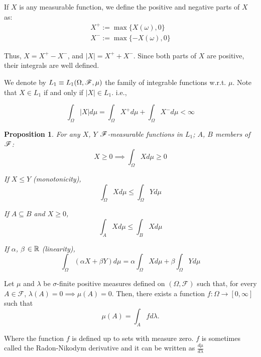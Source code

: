 \documentclass{beamer}
\newtheorem{proposition}{Proposition}[section]
\begin{document}
\begin{frame}
If $X$ is any measurable function, we define the positive and negative parts of $X$ as:
\begin{align}
	X^+ := \max\{X(\omega), 0\} \\
	X^- := \max\{-X(\omega), 0\}
\end{align}

Thus, $X = X^+ - X^-$, and $|X| = X^+ + X^-$. Since both parts of $X$ are positive, their integrals are well defined.\\

\begin{definition}[$L_1$ spaces]
We denote by $L_1 \equiv L_1(\Omega, \mathscr{F}, \mu)$ the family of integrable functions w.r.t. $\mu$. Note that $X \in L_1$ if and only if $|X| \in L_1$. i.e.,

\begin{equation}
	\int_\Omega |X| d\mu = \int_\Omega X^+ d\mu + \int_\Omega X^- d\mu < \infty
\end{equation}
\end{definition}
\end{frame}

\begin{frame}
\begin{proposition}
	For any $X$, $Y$ $\mathscr{F}$-measurable functions in $L_1$; $A$, $B$ members of $\mathscr{F}$:
	\[
		X \geq 0 \implies \int_\Omega X d\mu \geq 0
	\]
	
	If $X \leq Y$ (monotonicity),
	\[
		\int_\Omega X d\mu \leq \int_\Omega Y d\mu
	\]
	
	If $A \subseteq B$ and $X \geq 0$,
	\[
		\int_A X d\mu \leq \int_B X d\mu
	\]
	
	If $\alpha$, $\beta$ $\in \mathbb{R}$ (linearity),
	\[
	\int_\Omega (\alpha X + \beta Y) d\mu = \alpha \int_\Omega X d\mu + \beta \int_\Omega Y d\mu
	\]
\end{proposition}
\end{frame}

\begin{frame}
\begin{theorem}\label{th:radon-nikodym}
Let $\mu$ and $\lambda$ be $\sigma$-finite positive measures defined on $(\Omega, \mathscr{F})$ such that, for every $A \in \mathscr{F}$, $\lambda(A) = 0 \implies \mu(A)= 0$. Then, there exists a function $f: \Omega \to [0, \infty]$ such that
\[
	\mu(A) = \int_A f d\lambda.
\]

Where the function $f$ is defined up to sets with measure zero. $f$ is sometimes called the Radon-Nikodym derivative and it can be written as $\frac{d\mu}{d\lambda}$
\end{theorem}

\end{frame}
\end{document}
